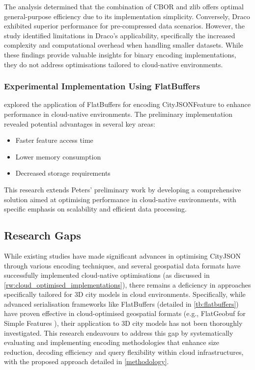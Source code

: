 The analysis determined that the combination of CBOR and zlib offers optimal general-purpose efficiency due to its implementation simplicity. Conversely, Draco exhibited superior performance for pre-compressed data scenarios. However, the study identified limitations in Draco's applicability, specifically the increased complexity and computational overhead when handling smaller datasets. While these findings provide valuable insights for binary encoding implementations, they do not address optimisations tailored to cloud-native environments.

\subsubsection{Experimental Implementation Using FlatBuffers}
\label{rw:cityjson_enhancements:performance:flatbuffers}
\citet{ravi_peters_2024_citybuf} explored the application of FlatBuffers \citep{flatbuffers} for encoding CityJSONFeature to enhance performance in cloud-native environments. The preliminary implementation revealed potential advantages in several key areas:

\begin{itemize}
  \item Faster feature access time
  \item Lower memory consumption
  \item Decreased storage requirements
\end{itemize}

This research extends Peters' preliminary work by developing a comprehensive solution aimed at optimising performance in cloud-native environments, with specific emphasis on scalability and efficient data processing.

\subsection{Research Gaps}
\label{rw:research_gaps}
While existing studies have made significant advances in optimising CityJSON through various encoding techniques, and several geospatial data formats have successfully implemented cloud-native optimisations (as discussed in \autoref{rw:cloud_optimised_implementations}), there remains a deficiency in approaches specifically tailored for 3D city models in cloud environments. Specifically, while advanced serialisation frameworks like FlatBuffers (detailed in \autoref{tb:flatbuffers}) have proven effective in cloud-optimised geospatial formats (e.g., FlatGeobuf for Simple Features \citep{flatgeobuf}), their application to 3D city models has not been thoroughly investigated. This research endeavours to address this gap by systematically evaluating and implementing encoding methodologies that enhance size reduction, decoding efficiency and query flexibility within cloud infrastructures, with the proposed approach detailed in \autoref{methodology}.

